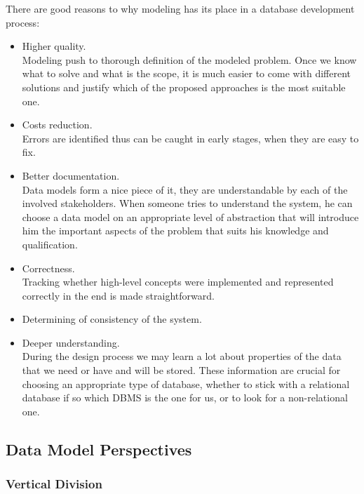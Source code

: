 There are good reasons to why modeling has its place in a database development process:

\begin{itemize}
	\item Higher quality.\\ Modeling push to thorough definition of the modeled problem. Once we know what to solve and what is the scope, it is much easier to come with different solutions and justify which of the proposed approaches is the most suitable one.
	
	\item Costs reduction.\\ Errors are identified thus can be caught in early stages, when they are easy to fix.
	
	\item Better documentation.\\ Data models form a nice piece of it, they are understandable by each of the involved stakeholders. When someone tries to understand the system, he can choose a data model on an appropriate level of abstraction that will introduce him the important aspects of the problem that suits his knowledge and qualification.
	
	\item Correctness.\\ Tracking whether high-level concepts were implemented and represented correctly in the end is made straightforward.
	
	\item Determining of consistency of the system.
	
	\item Deeper understanding.\\ During the design process we may learn a lot about properties of the data that we need or have and will be stored. These information are crucial for choosing an appropriate type of database, whether to stick with a relational database if so which DBMS is the one for us, or to look for a non-relational one.
\end{itemize}

\subsection{Data Model Perspectives}

\subsubsection{Vertical Division}


